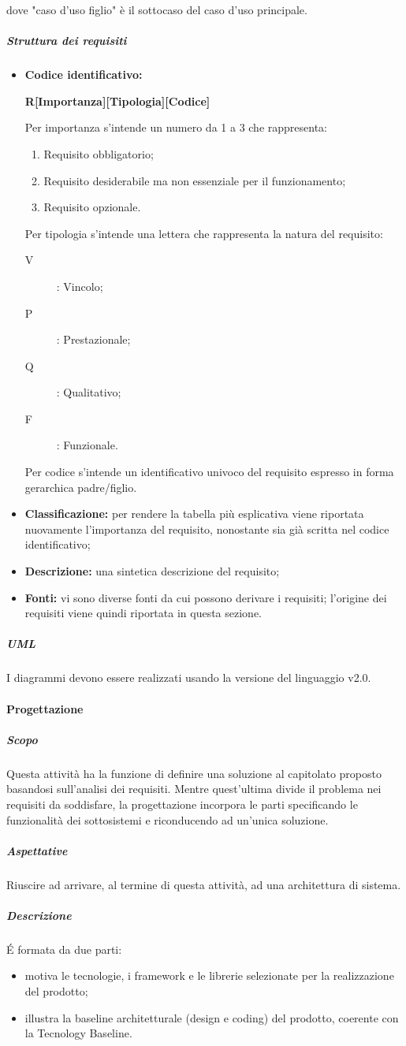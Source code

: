 dove "caso d'uso figlio" è il sottocaso del caso d'uso principale.
\subparagraph{Struttura dei requisiti} \label{para:requisiti}
\begin{itemize}
\item \textbf{Codice identificativo:} 
\begin{center}
\textbf{R[Importanza][Tipologia][Codice]}
\end{center}
 		
Per importanza s'intende un numero da 1 a 3 che rappresenta:
\begin{enumerate}
\item Requisito obbligatorio;
\item Requisito desiderabile ma non essenziale per il funzionamento;
\item Requisito opzionale.
\end{enumerate}
Per tipologia s'intende una lettera che rappresenta la natura del requisito:
\begin{description}
\item[V]: Vincolo;
\item[P]: Prestazionale;
\item[Q]: Qualitativo;
\item[F]: Funzionale.
\end{description}
Per codice s'intende un identificativo univoco del requisito espresso in forma gerarchica padre/figlio.
\item \textbf{Classificazione:} per rendere la tabella più esplicativa viene riportata nuovamente l'importanza del requisito, nonostante sia già scritta nel codice identificativo;
\item \textbf{Descrizione:} una sintetica descrizione del requisito;
\item \textbf{Fonti:} vi sono diverse fonti da cui possono derivare i requisiti; l'origine dei requisiti viene quindi riportata in questa sezione. 
\end{itemize}
\subparagraph{UML}
I diagrammi  devono essere realizzati usando la versione del linguaggio v2.0.
\paragraph{Progettazione}
\subparagraph{Scopo}
Questa attività ha la funzione di definire una soluzione al capitolato proposto basandosi sull'analisi dei requisiti.
Mentre quest'ultima divide il problema nei requisiti da soddisfare, la progettazione incorpora le parti specificando le funzionalità dei sottosistemi e riconducendo ad un'unica soluzione.
\subparagraph{Aspettative}
Riuscire ad arrivare, al termine di questa attività, ad una architettura di sistema.
\subparagraph{Descrizione}
\'E formata da due parti:
\begin{itemize}
\item {} motiva le tecnologie, i framework e le librerie selezionate per la realizzazione del prodotto;
\item {} illustra la baseline architetturale (design e coding) del prodotto, coerente con la Tecnology Baseline.
\end{itemize}

